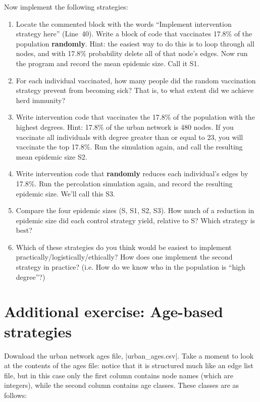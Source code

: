 \documentclass{article}
\begin{document}
Now implement the following strategies:
\begin{enumerate}
\item Locate the commented block with the words ``Implement intervention strategy here'' (Line~40).  Write a block 
of code that vaccinates 17.8\% of the population \textbf{randomly}. Hint: the easiest way to do this is to loop through
all nodes, and with 17.8\% probability delete all of that node's edges.  Now run the program and record the mean epidemic size. Call it S1.
\item For each individual vaccinated, how many people did the random vaccination strategy prevent from
becoming sick? That is, to what extent did we achieve herd immunity?
\item Write intervention code that vaccinates the 17.8\% of the population with the highest degrees.  Hint: 17.8\% of the urban
network is 480 nodes.  If you vaccinate all individuals with degree greater than or equal to 23, you will vaccinate the top 17.8\%.  Run the
simulation again, and call the resulting mean epidemic size S2.
\item Write intervention code that \textbf{randomly} reduces each individual's edges by 17.8\%.
Run the percolation simulation again, and record the resulting epidemic size.  We'll call this S3.
\item Compare the four epidemic sizes (S, S1, S2, S3).  How much of a reduction in epidemic size
 did each control strategy yield, relative to S?  Which strategy is best?
\item Which of these strategies do you think would be easiest to implement
practically/logistically/ethically? How does one implement the second strategy in practice? (i.e.
How do we know who in the population is ``high degree''?)

\end{enumerate}
\section*{Additional exercise: Age-based strategies}
Download the urban network ages file, |urban_ages.csv|.  Take a
moment to look at the contents of the ages file: notice that it is structured
much like an edge list file, but in this case only the first column contains node
names (which are integers), while the second column contains age classes.  These
classes are as follows:
\end{document}
